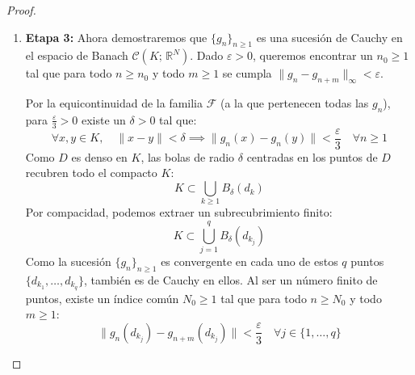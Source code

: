 \begin{proof}
\begin{enumerate}
        Definimos la sucesión diagonal $\{g_n\}_{n \geq 1} = \{f_n^n\}_{n \geq 1}$. Para cualquier $m \geq 1$ fijado, notemos que $\{g_n\}_{n \geq m}$ es una subsucesión de la fila $m$-ésima ($\{f_n^m\}_{n \geq 1}$), y por tanto es convergente en $d_m$. Concluimos que la sucesión diagonal $\{g_n\}_{n \geq 1}$ es convergente puntualmente en todos los puntos del conjunto denso $D$.

        \item \textbf{Etapa 3:} Ahora demostraremos que $\{g_n\}_{n \geq 1}$ es una sucesión de Cauchy en el espacio de Banach $\mathcal{C}(K; \, \mathbb{R}^N)$. 
        Dado $\varepsilon > 0$, queremos encontrar un $n_0 \geq 1$ tal que para todo $n \geq n_0$ y todo $m \geq 1$ se cumpla $\|g_n - g_{n+m}\|_\infty < \varepsilon$.

        Por la equicontinuidad de la familia $\mathcal{F}$ (a la que pertenecen todas las $g_n$), para $\frac{\varepsilon}{3} > 0$ existe un $\delta > 0$ tal que:
        \[
            \forall x, y \in K, \quad \|x - y\| < \delta \implies \|g_n(x) - g_n(y)\| < \frac{\varepsilon}{3} \quad \forall n \geq 1
        \]
        Como $D$ es denso en $K$, las bolas de radio $\delta$ centradas en los puntos de $D$ recubren todo el compacto $K$:
        \[
            K \subset \bigcup_{k \geq 1} B_\delta(d_k)
        \]
        Por compacidad, podemos extraer un subrecubrimiento finito:
        \[
            K \subset \bigcup_{j=1}^{q} B_\delta(d_{k_j})
        \]
        Como la sucesión $\{g_n\}_{n \geq 1}$ es convergente en cada uno de estos $q$ puntos $\{d_{k_1}, \dots, d_{k_q}\}$, también es de Cauchy en ellos. Al ser un número finito de puntos, existe un índice común $N_0 \geq 1$ tal que para todo $n \geq N_0$ y todo $m \geq 1$:
        \[
            \|g_n(d_{k_j}) - g_{n+m}(d_{k_j})\| < \frac{\varepsilon}{3} \quad \forall j \in \{1, \ldots, q\}
        \]


\end{enumerate}
\end{proof}
